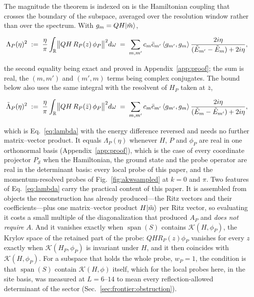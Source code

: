 The magnitude the theorem is indexed on is the Hamiltonian coupling that crosses the boundary of the
subspace, averaged over the resolution window rather than over the spectrum. With
$g_m=QH\lvert \tilde m \rangle$,
\begin{widetext}
\begin{equation}
\Lambda_P(\eta)^{2}\;:=\;\frac{\eta}{\pi}\int_{\mathbb R}
\bigl\lVert QH\,R_P(z)\,\phi_P\bigr\rVert^{2}d\omega
\;=\;\sum_{m,m'}c_m\bar c_{m'}\,\braket{g_{m'},g_m}\,
\frac{2i\eta}{(\tilde E_{m'}-\tilde E_m)+2i\eta},
\label{eq:lambda}
\end{equation}
\end{widetext}
the second equality being exact and proved in Appendix~\ref{app:proof}; the sum is real, the $(m,m')$ and $(m',m)$ terms
being complex conjugates. The bound below also uses the same integral with the resolvent of $H_P$ taken at $\bar z$,
\begin{widetext}
\begin{equation}
\tilde\Lambda_P(\eta)^{2}\;:=\;\frac{\eta}{\pi}\int_{\mathbb R}
\bigl\lVert QH\,R_P(\bar z)\,\phi_P\bigr\rVert^{2}d\omega
\;=\;\sum_{m,m'}c_m\bar c_{m'}\,\braket{g_{m'},g_m}\,
\frac{2i\eta}{(\tilde E_{m}-\tilde E_{m'})+2i\eta},
\label{eq:lambdatilde}
\end{equation}
\end{widetext}
which is Eq.~\eqref{eq:lambda} with the energy difference reversed and needs no further matrix--vector product.
It equals $\Lambda_P(\eta)$ whenever $H$, $P$ and $\phi_P$ are real in one orthonormal basis
(Appendix~\ref{app:proof}), which is the case of every coordinate projector $P_{\mathcal S}$ when the
Hamiltonian, the ground state and the probe operator are real in the determinant basis: every local probe of
this paper, and the momentum-resolved probes of Fig.~\ref{fig:akwsampled} at $k=0$ and $\pi$. Two features of Eq.~\eqref{eq:lambda} carry the practical content of this
paper. It is assembled from objects the reconstruction has already produced---the Ritz vectors and
their coefficients---plus one matrix--vector product $H\lvert \tilde m \rangle$ per Ritz vector, so evaluating
it costs a small multiple of the diagonalization that produced $A_P$ and \emph{does not require} $A$.
And it vanishes exactly when $\operatorname{span}(S)$ contains $\mathcal K(H,\phi_P)$, the Krylov space of the retained part of the probe: $QHR_P(z)\phi_P$ vanishes for every $z$ exactly when $\mathcal K(H_P,\phi_P)$ is invariant under $H$, and it then coincides with $\mathcal K(H,\phi_P)$. For a subspace that holds the whole probe, $w_P=1$, the condition is that $\operatorname{span}(S)$ contain $\mathcal K(H,\phi)$ itself, which for the local probes here, in the site basis, was measured at $L=6$--$14$ to mean every reflection-allowed determinant of the sector (Sec.~\ref{sec:frontier:obstruction}).

